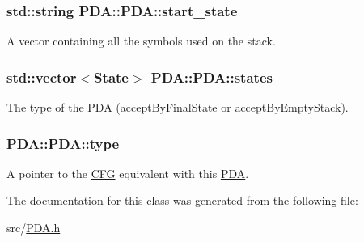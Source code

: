 \hypertarget{classPDA_1_1PDA_af346efb9a6812d704d69299eef9262e6}{
\subsubsection[{start\-\_\-state}]{\setlength{\rightskip}{0pt plus 5cm}std\-::string {\bf \-P\-D\-A\-::\-P\-D\-A\-::start\-\_\-state}}}\label{d1/dc5/classPDA_1_1PDA_af346efb9a6812d704d69299eef9262e6}


\-A vector containing all the symbols used on the stack. 

\hypertarget{classPDA_1_1PDA_a38d40f2c938f18d396ea2b13ca361271}{
\subsubsection[{states}]{\setlength{\rightskip}{0pt plus 5cm}std\-::vector$<${\bf \-State}$>$ {\bf \-P\-D\-A\-::\-P\-D\-A\-::states}}}\label{d1/dc5/classPDA_1_1PDA_a38d40f2c938f18d396ea2b13ca361271}


\-The type of the \hyperlink{classPDA_1_1PDA}{\-P\-D\-A} (accept\-By\-Final\-State or accept\-By\-Empty\-Stack). 

\hypertarget{classPDA_1_1PDA_a15524b46d2be399f384b0f236ccb38f4}{
\subsubsection[{type}]{ {\bf \-P\-D\-A\-::\-P\-D\-A\-::type}}}\label{d1/dc5/classPDA_1_1PDA_a15524b46d2be399f384b0f236ccb38f4}


\-A pointer to the \hyperlink{classCFG}{\-C\-F\-G} equivalent with this \hyperlink{classPDA_1_1PDA}{\-P\-D\-A}. 



\-The documentation for this class was generated from the following file\-:\begin{DoxyCompactItemize}
\item 
src/\hyperlink{PDA_8h}{\-P\-D\-A.\-h}\end{DoxyCompactItemize}
